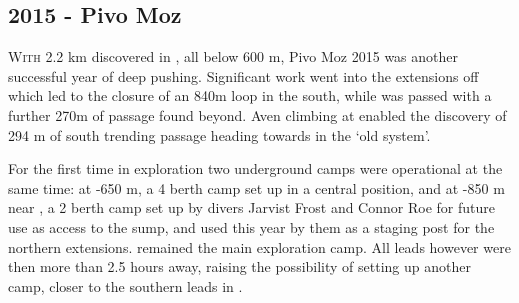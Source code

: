 \newpage
\begin{tcolorbox}
\chapter{2015 - Pivo Moz}
		\lettrine{W}{ith} 2.2 km discovered in , all below 600 m, Pivo Moz 2015 was another successful year of deep pushing. Significant work went into the extensions off  which led to the closure of an 840m loop in the south, while  was passed with a further 270m of passage found beyond. Aven climbing at  enabled the discovery of 294 m of south trending passage heading towards  in the ‘old system’. 

		For the first time in  exploration two underground camps were operational at the same time: at -650 m, a 4 berth camp set up in a central position, and  at -850 m near , a 2 berth camp set up by divers Jarvist Frost and Connor Roe for future use as access to the  sump, and used this year by them as a staging post for the northern extensions.  remained the main exploration camp. All leads however were then more than 2.5 hours away, raising the possibility of setting up another camp, closer to the southern leads in .
	

\end{tcolorbox}
\BgThispage



